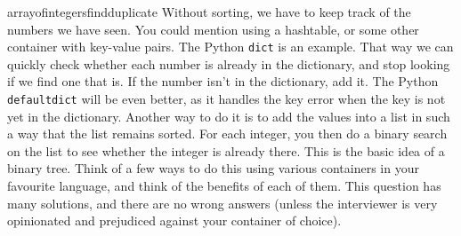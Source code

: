 \begin{answer}{arrayofintegersfindduplicate}
 Without sorting, we have to keep track of the numbers we have seen.
 You could mention using a hashtable, or some other container with key-value pairs.
 The Python \verb+dict+ is an example.
 That way we can quickly check whether each number is already in the dictionary, and stop looking if we find one that is.
 If the number isn't in the dictionary, add it.
 The Python \verb+defaultdict+ will be even better, as it handles the key error when the key is not yet in the dictionary.
 Another way to do it is to add the values into a list in such a way that the list remains sorted.
 For each integer, you then do a binary search on the list to see whether the integer is already there.
 This is the basic idea of a binary tree.
 Think of a few ways to do this using various containers in your favourite language, and think of the benefits of each of them.
 This question has many solutions, and there are no wrong answers (unless the interviewer is very opinionated and prejudiced against your container of choice).



\end{answer}
